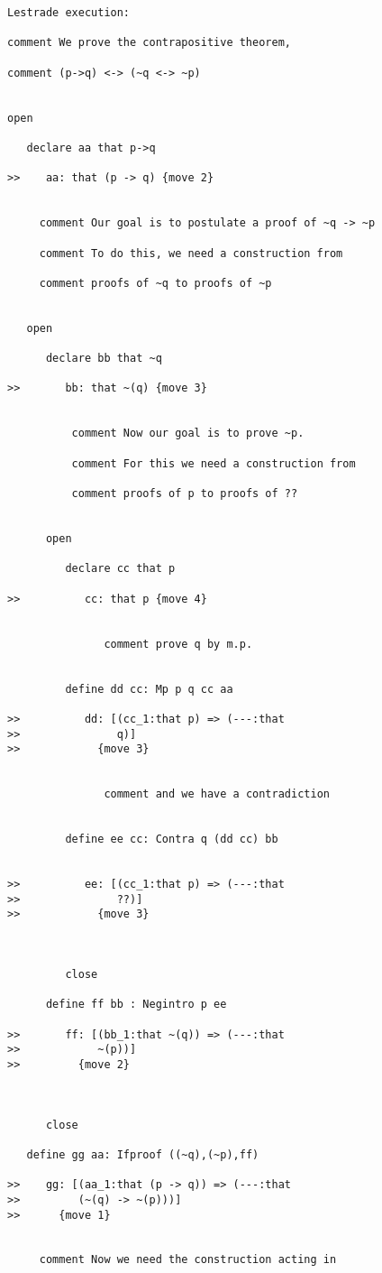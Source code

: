 \documentclass[12pt]{article}
\begin{document}
\begin{verbatim}Lestrade execution:

comment We prove the contrapositive theorem,

comment (p->q) <-> (~q <-> ~p)


open

   declare aa that p->q

>>    aa: that (p -> q) {move 2}


     comment Our goal is to postulate a proof of ~q -> ~p

     comment To do this, we need a construction from

     comment proofs of ~q to proofs of ~p


   open

      declare bb that ~q

>>       bb: that ~(q) {move 3}


          comment Now our goal is to prove ~p.

          comment For this we need a construction from 

          comment proofs of p to proofs of ??


      open

         declare cc that p

>>          cc: that p {move 4}


               comment prove q by m.p.


         define dd cc: Mp p q cc aa

>>          dd: [(cc_1:that p) => (---:that
>>               q)]
>>            {move 3}


               comment and we have a contradiction


         define ee cc: Contra q (dd cc) bb


>>          ee: [(cc_1:that p) => (---:that
>>               ??)]
>>            {move 3}



         close

      define ff bb : Negintro p ee

>>       ff: [(bb_1:that ~(q)) => (---:that
>>            ~(p))]
>>         {move 2}



      close

   define gg aa: Ifproof ((~q),(~p),ff)

>>    gg: [(aa_1:that (p -> q)) => (---:that
>>         (~(q) -> ~(p)))]
>>      {move 1}


     comment Now we need the construction acting in


\end{verbatim}
\end{document}
